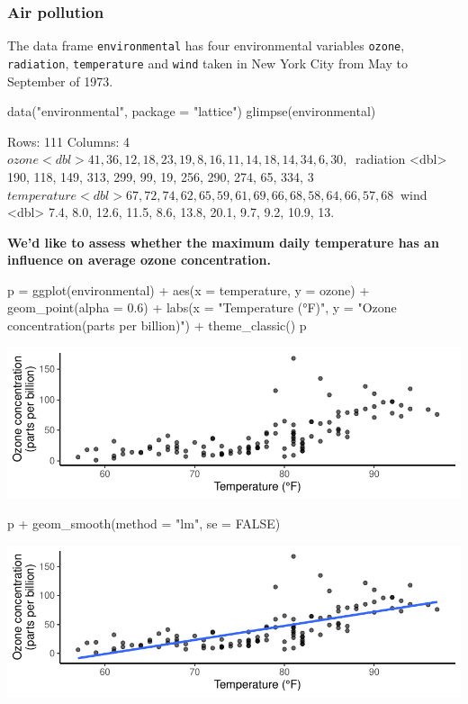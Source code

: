 \documentclass[a4paper]{article}\usepackage[]{graphicx}\usepackage[]{xcolor}
\makeatletter
\def\maxwidth{ %
  \ifdim\Gin@nat@width>\linewidth
    \linewidth
  \else
    \Gin@nat@width
  \fi
}
\makeatother
\begin{document}
\subsubsection{Air pollution}
The data frame \lstinline|environmental| has four environmental variables \lstinline|ozone|, \lstinline|radiation|, \lstinline|temperature| and \lstinline|wind| taken in New York City from May to September of 1973.
\begin{Schunk}
\begin{Sinput}
data("environmental", package = "lattice")
glimpse(environmental)
\end{Sinput}
\begin{Soutput}
Rows: 111
Columns: 4
$ ozone       <dbl> 41, 36, 12, 18, 23, 19, 8, 16, 11, 14, 18, 14, 34, 6, 30, ~
$ radiation   <dbl> 190, 118, 149, 313, 299, 99, 19, 256, 290, 274, 65, 334, 3~
$ temperature <dbl> 67, 72, 74, 62, 65, 59, 61, 69, 66, 68, 58, 64, 66, 57, 68~
$ wind        <dbl> 7.4, 8.0, 12.6, 11.5, 8.6, 13.8, 20.1, 9.7, 9.2, 10.9, 13.~
\end{Soutput}
\end{Schunk}
\begin{greenbox}
	\textbf{We'd like to assess whether the maximum daily temperature has an influence on average ozone concentration.}
\end{greenbox}
\begin{Schunk}
\begin{Sinput}
p = ggplot(environmental) + aes(x = temperature, y = ozone) + 
  geom_point(alpha = 0.6) + 
  labs(x = "Temperature (°F)", y = "Ozone concentration\n(parts per billion)") +
  theme_classic()
p
\end{Sinput}


{\centering \includegraphics[width=\maxwidth]{figure/listings-unnamed-chunk-334-1} 

}

\begin{Sinput}
p + geom_smooth(method = "lm", se = FALSE)
\end{Sinput}


{\centering \includegraphics[width=\maxwidth]{figure/listings-unnamed-chunk-334-2} 

}

\end{Schunk}
\end{document}
